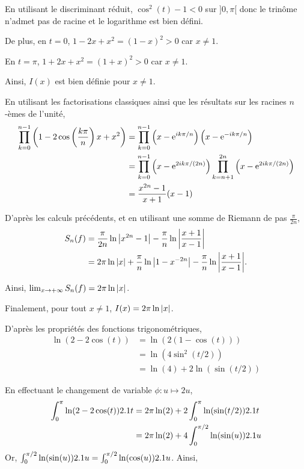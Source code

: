 \begin{solution}
\begin{reponses}
\item En utilisant le discriminant réduit, $\cos^2(t) - 1 < 0$ sur $]0,\pi[$ donc le trinôme n'admet pas de racine et le logarithme est bien défini.

De plus, en $t = 0$, $1 - 2 x + x^2 = (1 - x)^2 > 0$ car $x \neq 1$.

En $t = \pi$, $1 + 2 x + x^2 = (1 + x)^2 > 0$ car $x \neq 1$.

Ainsi, $I(x)$ est bien définie pour $x \neq 1$.

\item En utilisant les factorisations classiques ainsi que les résultats sur les racines $n$-èmes de l'unité,
\begin{align*}
\prod_{k=0}^{n-1} \left(1 - 2 \cos\left(\frac{k\pi}{n}\right) x + x^2\right)
&= \prod_{k=0}^{n-1} \left(x - \mathrm{e}^{ik\pi/n}\right) \left(x - \mathrm{e}^{-ik\pi/n}\right) \\
&= \prod_{k=0}^{n-1} \left(x - \mathrm{e}^{2ik\pi/(2n)}\right) \prod_{k=n+1}^{2n} \left(x - \mathrm{e}^{2ik\pi/(2n)}\right) \\
&= \frac{x^{2n} - 1}{x + 1} (x - 1)
\end{align*}
\item D'après les calculs précédents, et en utilisant une somme de Riemann de pas $\frac{\pi}{2n}$,
\begin{align*}
S_n(f) &= \frac{\pi}{2n} \ln\abs{x^{2n}-1} - \frac{\pi}{n} \ln \abs{\frac{x+1}{x-1}} \\
&= 2 \pi \ln\abs{x} + \frac{\pi}{n} \ln \abs{1 - x^{-2n}} - \frac{\pi}{n} \ln \abs{\frac{x+1}{x-1}}.
\end{align*}

Ainsi, $\lim_{x\to +\infty} S_n(f) = 2 \pi \ln\abs{x}$.

Finalement, pour tout $x \neq 1$, $I(x) = 2 \pi \ln\abs{x}$.
\item D'après les propriétés des fonctions trigonométriques,
\begin{align*}
\ln(2 - 2 \cos(t)) &= \ln(2(1 - \cos(t))) \\
&= \ln(4 \sin^2(t/2)) \\
&= \ln(4) + 2 \ln(\sin(t/2))
\end{align*}

\item En effectuant le changement de variable $\phi : u \mapsto 2 u$,
\begin{align*}
\int_0^\pi \ln(2 - 2 \cos(t)) 2.1 t &= 2 \pi \ln(2) + 2 \int_0^\pi \ln(\sin(t/2)) 2.1 t \\
&= 2 \pi \ln(2) + 4 \int_0^{\pi/2} \ln(\sin(u)) 2.1 u
\end{align*}
Or, $\int_0^{\pi/2} \ln(\sin(u)) 2.1 u = \int_0^{\pi/2} \ln(\cos(u)) 2.1 u$. Ainsi,


\end{reponses}
\end{solution}
